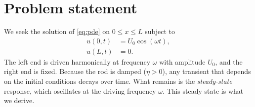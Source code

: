 \section{Problem statement}

We seek the solution of \cref{eq:pde} on $0 \le x \le L$ subject to
\begin{align}
  u(0,t) &= U_0 \cos(\omega t), \label{eq:bc0}\\
  u(L,t) &= 0. \label{eq:bcL}
\end{align}
The left end is driven harmonically at frequency $\omega$ with amplitude
$U_0$, and the right end is fixed. Because the rod is damped ($\eta>0$), any
transient that depends on the initial conditions decays over time. What
remains is the \emph{steady-state} response, which oscillates at the driving
frequency $\omega$. This steady state is what we derive.
